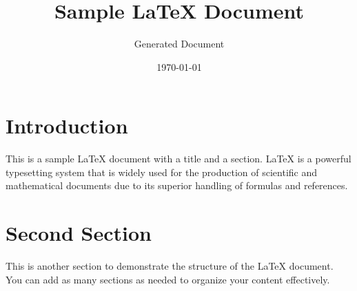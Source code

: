 \documentclass{article}
\title{Sample LaTeX Document}
\author{Generated Document}
\date{\today}
\begin{document}
\maketitle

\section{Introduction}
This is a sample LaTeX document with a title and a section. LaTeX is a powerful typesetting system that is widely used for the production of scientific and mathematical documents due to its superior handling of formulas and references.

\section{Second Section}
This is another section to demonstrate the structure of the LaTeX document. You can add as many sections as needed to organize your content effectively.
\end{document}

